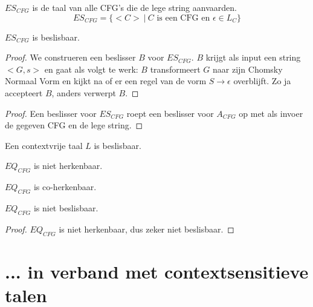 \documentclass[main.tex]{subfiles}
\begin{document}
\begin{de}
  \label{de:es-cfg}
  $ES_{CFG}$ is de taal van alle CFG's die de lege string aanvaarden.
  \[ ES_{CFG} = \{ <C> \ |\ C \text{ is een CFG en } \epsilon \in L_{C}\} \]
\end{de}

\begin{st}
  \label{st:es-cfg-besl}
  $ES_{CFG}$ is beslisbaar.

  \begin{proof}
    We construeren een beslisser $B$ voor $ES_{CFG}$.
    $B$ krijgt als input een string $<G,s>$ en gaat als volgt te werk:
    $B$ transformeert $G$ naar zijn Chomsky Normaal Vorm en kijkt na of er een regel van de vorm $S \rightarrow \epsilon$ overblijft.
    Zo ja accepteert $B$, anders verwerpt $B$.
  \end{proof}

  \begin{proof}
    Een beslisser voor $ES_{CFG}$ roept een beslisser voor $A_{CFG}$ op met als invoer de gegeven CFG en de lege string.
  \end{proof}
\end{st}

\begin{st}
  \label{st:contextvrije-taal-besl}
  Een contextvrije taal $L$ is beslisbaar.

\end{st}

\begin{st}
  \label{st:eq-cfg-niet-herk}
  $EQ_{CFG}$ is niet herkenbaar.
\end{st}

\begin{st}
  \label{st:eq-cfg-coherk}
  $EQ_{CFG}$ is co-herkenbaar.
\end{st}

\begin{gev}
  \label{gev:eq-cfg-niet-besl}
  $EQ_{CFG}$ is niet beslisbaar.

  \begin{proof}
    $EQ_{CFG}$ is niet herkenbaar, dus zeker niet beslisbaar.
  \end{proof}
\end{gev}

\section{... in verband met contextsensitieve talen}
\label{sec:-verb-met-csls}
\end{document}
